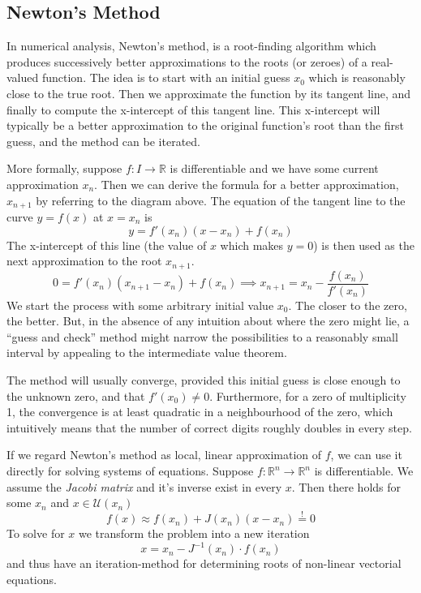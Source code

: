 \subsection{Newton's Method}
In numerical analysis, Newton's method, is a root-finding algorithm which produces successively better approximations to the roots (or zeroes) of a real-valued function.
The idea is to start with an initial guess \(x_0\) which is reasonably close to the true root.
Then we approximate the function by its tangent line, and finally to compute the x-intercept of this tangent line.
This x-intercept will typically be a better approximation to the original function's root than the first guess, and the method can be iterated.

\begin{center}
   
\end{center}

More formally, suppose \(f: I \to \mathbb{R}\) is differentiable and we have some current approximation \(x_n\).
Then we can derive the formula for a better approximation, \(x_{n+1}\) by referring to the diagram above.
The equation of the tangent line to the curve \(y = f(x)\) at \(x = x_n\) is
\[y = f'(x_n) (x - x_n) + f(x_n)\]
The x-intercept of this line (the value of \(x\) which makes \(y = 0\)) is then used as the next approximation to the root \(x_{n+1}\).
\[0 = f'(x_n) (x_{n+1} - x_n) + f(x_n) \implies x_{n+1} = x_n - \frac{f(x_n)}{f'(x_n)}\]
We start the process with some arbitrary initial value \(x_0\).
The closer to the zero, the better.
But, in the absence of any intuition about where the zero might lie, a ``guess and check''  method might narrow the possibilities to a reasonably small interval by appealing to the intermediate value theorem.



The method will usually converge, provided this initial guess is close enough to the unknown zero, and that \(f'(x_0) \neq 0\).
Furthermore, for a zero of multiplicity 1, the convergence is at least quadratic in a neighbourhood of the zero, which intuitively means that the number of correct digits roughly doubles in every step.

If we regard Newton's method as local, linear approximation of \(f\), we can use it directly for solving systems of equations.
Suppose \(f: \mathbb{R}^n \to \mathbb{R}^n\) is differentiable.
We assume the \emph{Jacobi matrix} and it's inverse exist in every \(x\).
Then there holds for some \(x_n\) and \(x \in \mathcal{U}(x_n)\)
\[f(x) \approx f(x_n) + J(x_n)(x - x_n) \overset{!}{=} 0\]
To solve for \(x\) we transform the problem into a new iteration
\[x = x_n - J^{-1}(x_n) \cdot f(x_n)\]
and thus have an iteration-method for determining roots of non-linear vectorial equations.


